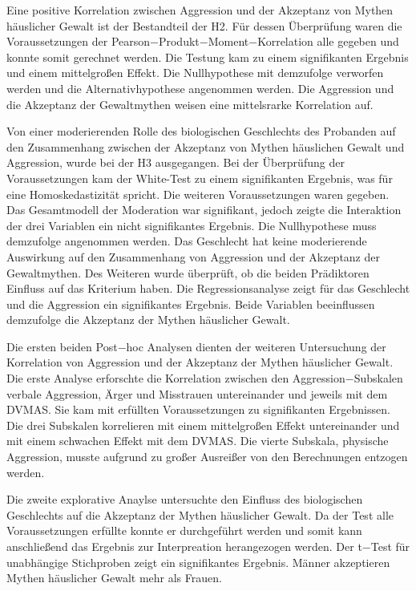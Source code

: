 Eine positive Korrelation zwischen Aggression und der Akzeptanz von Mythen häuslicher Gewalt ist der Bestandteil der H2. Für dessen Überprüfung waren die Voraussetzungen der Pearson$-$Produkt$-$Moment$-$Korrelation alle gegeben und konnte somit gerechnet werden. Die Testung kam zu einem signifikanten Ergebnis und einem mittelgroßen Effekt. Die Nullhypothese mit demzufolge verworfen werden und die Alternativhypothese angenommen werden. Die Aggression und die Akzeptanz der Gewaltmythen weisen eine mittelsrarke Korrelation auf.

Von einer moderierenden Rolle des biologischen Geschlechts des Probanden auf den Zusammenhang zwischen der Akzeptanz von Mythen häuslichen Gewalt und Aggression, wurde bei der H3 ausgegangen. Bei der Überprüfung der Voraussetzungen kam der White-Test zu einem signifikanten Ergebnis, was für eine Homoskedastizität spricht. Die weiteren Voraussetzungen waren gegeben. Das Gesamtmodell der Moderation war signifikant, jedoch zeigte die Interaktion der drei Variablen ein nicht signifikantes Ergebnis. Die Nullhypothese muss demzufolge angenommen werden. Das Geschlecht hat keine moderierende Auswirkung auf den Zusammenhang von Aggression und der Akzeptanz der Gewaltmythen. Des Weiteren wurde überprüft, ob die beiden Prädiktoren Einfluss auf das Kriterium haben. Die Regressionsanalyse zeigt für das Geschlecht und die Aggression ein signifikantes Ergebnis. Beide Variablen beeinflussen demzufolge die Akzeptanz der Mythen häuslicher Gewalt.

Die ersten beiden Post$-$hoc Analysen dienten der weiteren Untersuchung der Korrelation von Aggression und der Akzeptanz der Mythen häuslicher Gewalt. Die erste Analyse erforschte die Korrelation zwischen den Aggression$-$Subskalen verbale Aggression, Ärger und Misstrauen untereinander und jeweils mit dem DVMAS. Sie kam mit erfüllten Voraussetzungen zu signifikanten Ergebnissen. Die drei Subskalen korrelieren mit einem mittelgroßen Effekt untereinander und mit einem schwachen Effekt mit dem DVMAS. Die vierte Subskala, physische Aggression, musste aufgrund zu großer Ausreißer von den Berechnungen entzogen werden.

Die zweite explorative Anaylse untersuchte den Einfluss des biologischen Geschlechts auf die Akzeptanz der Mythen häuslicher Gewalt. Da der Test alle Voraussetzungen erfüllte konnte er durchgeführt werden und somit kann anschließend das Ergebnis zur Interpreation herangezogen werden. Der t$-$Test für unabhängige Stichproben zeigt ein signifikantes Ergebnis. Männer akzeptieren Mythen häuslicher Gewalt mehr als Frauen.

